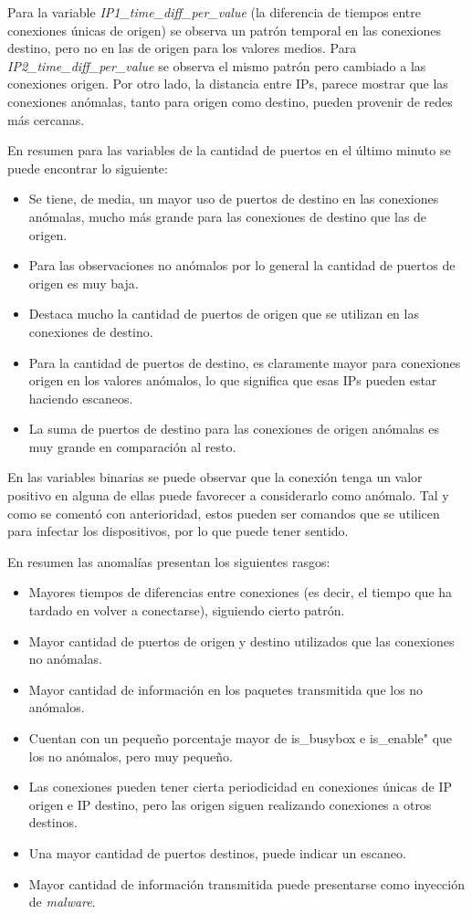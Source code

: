 Para la variable \textit{IP1\_time\_diff\_per\_value} (la diferencia de tiempos entre conexiones únicas de origen) se observa un patrón temporal en las conexiones destino, pero no en las de origen para los valores medios. Para \textit{IP2\_time\_diff\_per\_value} se observa el mismo patrón pero cambiado a las conexiones origen. Por otro lado, la distancia entre IPs, parece mostrar que las conexiones anómalas, tanto para origen como destino, pueden provenir de redes más cercanas.

En resumen para las variables de la cantidad de puertos en el último minuto se puede encontrar lo siguiente:

\begin{itemize}
    \item Se tiene, de media, un mayor uso de puertos de destino en las conexiones anómalas, mucho más grande para las conexiones de destino que las de origen.
    \item Para las observaciones no anómalos por lo general la cantidad de puertos de origen es muy baja.
    \item Destaca mucho la cantidad de puertos de origen que se utilizan en las conexiones de destino.
    \item Para la cantidad de puertos de destino, es claramente mayor para conexiones origen en los valores anómalos, lo que significa que esas IPs pueden estar haciendo escaneos.
    \item La suma de puertos de destino para las conexiones de origen anómalas es muy grande en comparación al resto. 
\end{itemize}

En las variables binarias se puede observar que la conexión tenga un valor positivo en alguna de ellas puede favorecer a considerarlo como anómalo. Tal y como se comentó con anterioridad, estos pueden ser comandos que se utilicen para infectar los dispositivos, por lo que puede tener sentido.

En resumen las anomalías presentan los siguientes rasgos:

\begin{itemize}
    \item Mayores tiempos de diferencias entre conexiones (es decir, el tiempo que ha tardado en volver a conectarse), siguiendo cierto patrón.
    \item Mayor cantidad de puertos de origen y destino utilizados que las conexiones no anómalas.
    \item Mayor cantidad de información en los paquetes transmitida que los no anómalos.
    \item Cuentan con un pequeño porcentaje mayor de is\_busybox e is\_enable" que los no anómalos, pero muy pequeño.
    \item Las conexiones pueden tener cierta periodicidad en conexiones únicas de IP origen e IP destino, pero las origen siguen realizando conexiones a otros destinos.
    \item Una mayor cantidad de puertos destinos, puede indicar un escaneo.
    \item Mayor cantidad de información transmitida puede presentarse como inyección de \textit{malware}.
\end{itemize}
